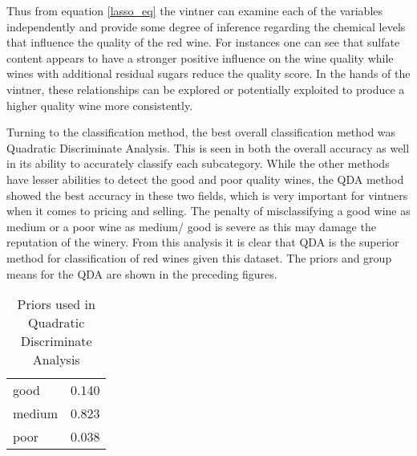 \documentclass[]{article}
\begin{document}
Thus from equation \ref{lasso_eq} the vintner can examine each of the
variables independently and provide some degree of inference regarding
the chemical levels that influence the quality of the red wine. For
instances one can see that sulfate content appears to have a stronger
positive influence on the wine quality while wines with additional
residual sugars reduce the quality score. In the hands of the vintner,
these relationships can be explored or potentially exploited to produce
a higher quality wine more consistently. \linebreak

Turning to the classification method, the best overall classification
method was Quadratic Discriminate Analysis. This is seen in both the
overall accuracy as well in its ability to accurately classify each
subcategory. While the other methods have lesser abilities to detect the
good and poor quality wines, the QDA method showed the best accuracy in
these two fields, which is very important for vintners when it comes to
pricing and selling. The penalty of misclassifying a good wine as medium
or a poor wine as medium/ good is severe as this may damage the
reputation of the winery. From this analysis it is clear that QDA is the
superior method for classification of red wines given this dataset. The
priors and group means for the QDA are shown in the preceding figures.

\begin{longtable}[]{@{}lr@{}}
\caption{Priors used in Quadratic Discriminate Analysis}\tabularnewline
\toprule
good & 0.140\tabularnewline
medium & 0.823\tabularnewline
poor & 0.038\tabularnewline
\bottomrule
\end{longtable}
\end{document}
